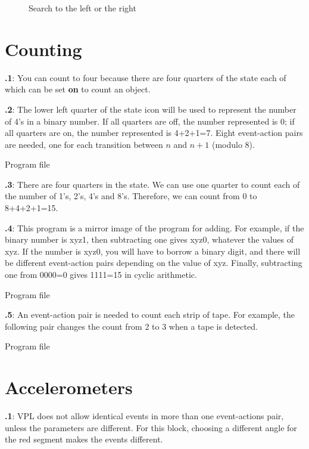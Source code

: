 \documentclass[11pt,a4paper,english]{article}
\begin{document}
\begin{figure}
\begin{center}
\caption{Search to the left or the right}\label{fig.follow1}
\end{center}
\end{figure}

\section{Counting}

\textbf{\thesection.1}:
You can count to four because there are four quarters of the state
each of which can be set \textbf{on} to count an object.

\textbf{\thesection.2}:
The lower left quarter of the state icon will be used to represent the
number of 4's in a binary number. If all quarters are off, the number represented
is 0; if all quarters are on, the number represented is 4+2+1=7.
Eight event-action pairs are needed, one for each transition between $n$ and
$n+1$ (modulo 8).

{\raggedleft \hfill Program file }


\textbf{\thesection.3}:
There are four quarters in the state. We can use one quarter to count
each of the number of 1's, 2's, 4's and 8's. Therefore, we can count
from 0 to 8+4+2+1=15.


\textbf{\thesection.4}:
This program is a mirror image of the program for adding.
For example, if the binary number is xyz1,
then subtracting one gives xyz0, whatever the values of xyz.
If the number is xyz0, you will have to borrow a binary digit,
and there will be different event-action pairs depending on the value
of xyz. Finally, subtracting one from 0000=0 gives 1111=15 in cyclic
arithmetic.

{\raggedleft \hfill Program file }

\newpage

\textbf{\thesection.5}:
An event-action pair is needed to count each strip of tape.
For example, the following pair  changes the count from 2 to 3 when a tape is detected.

{\raggedleft \hfill Program file }


\section{Accelerometers}

\textbf{\thesection.1}: VPL does not allow identical events in more than
one event-actions pair, unless the parameters are different. For this
block, choosing a different angle for the red segment makes the events
different.
\end{document}
